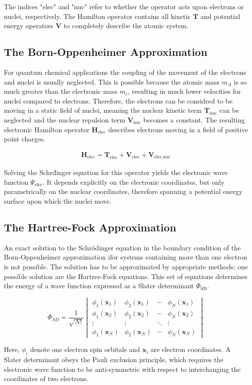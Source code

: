 The indices "elec" and "nuc" refer to whether the operator acts upon electrons
or nuclei, respectively. The Hamilton operator contains all kinetic
$\mathbf{T}$ and potential energy operators $\mathbf{V}$ to completely describe
the atomic system.

\subsection{The Born-Oppenheimer Approximation}

For quantum chemical applications the coupling of the movement of the electrons
and nuclei is usually neglected. This is possible because the atomic mass $m_A$
is so much greater than the electronic mass $m_i$, resulting in much lower
velocities for nuclei compared to electrons. Therefore, the electrons can be
considred to be moving in a static field of nuclei, meaning the nuclear kinetic
term $\mathbf{T}_\text{nuc}$ can be neglected and the nuclear repulsion term
$\mathbf{V}_\text{nuc}$ becomes a constant. The resulting electronic Hamilton
operator $\mathbf{H}_\text{elec}$ describes electrons moving in a field of
positive point charges.

\begin{align}
    \mathbf{H}_\text{elec}=\mathbf{T}_\text{elec} + \mathbf{V}_\text{elec} + \mathbf{V}_\text{elec,nuc}
\end{align}

Solving the Schr\"dinger equation for this operator yields the electronic wave
function $\Psi_\text{elec}$. It depends explicitly on the electronic
coordinates, but only parametrically on the nuclear coordinates, therefore
spanning a potential energy surface upon which the nuclei move.

\subsection{The Hartree-Fock Approximation}

An exact solution to the Schr\"odinger equation in the boundary condition of
the Born-Oppenheimer approximation ifor systems containing more than one
electron is not possible. The solution has to be approximated by appropriate
methods; one possible solution are the Hartree-Fock equations. This set of
equations determines the energy of a wave function expressed as a Slater
determinant $\Phi_\text{SD}$.

\begin{equation}
     \Phi_{SD}=\frac{1}{\sqrt{N!}}
     \begin{vmatrix}
         \phi_1(\mathbf{x}_1) & \phi_2(\mathbf{x}_1) & \cdots & \phi_N(\mathbf{x}_1)\\
         \phi_1(\mathbf{x}_2) & \phi_2 (\mathbf{x}_2) & \cdots & \phi_N(\mathbf{x}_2)\\
         \vdots & \vdots & \ddots & \vdots\\
         \phi_1(\mathbf{x}_N) & \phi_2(\mathbf{x}_N) & \cdots & \phi_N(\mathbf{x}_N)
     \end{vmatrix}
     \label{eqn:SlaterDet}
\end{equation}

Here, $\phi_i$ denote one electron spin orbitals and $\mathbf{x}_i$ are
electron coordinates. A Slater determinant obeys the Pauli exclusion principle,
which requires the electronic wave function to be anti-symmetric with respect
to interchanging the coordinates of two electrons.
